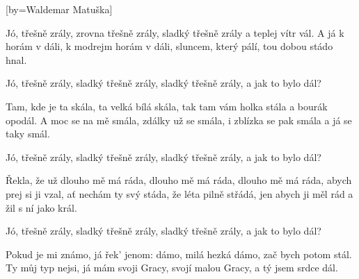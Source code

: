 [by={Waldemar Matuška}]

\beginverse{}
Jó, třešně zrály, zrovna třešně zrály,
sladký třešně zrály a teplej vítr vál. 
A já k horám v dáli, k modrejm horám v dáli,
sluncem, který pálí, tou dobou stádo hnal.
\endverse{}

\beginchorus{}
Jó, třešně zrály, sladký třešně zrály,
sladký třešně zrály, a jak to bylo dál?
\endchorus{}

\beginverse{}
Tam, kde je ta skála, ta velká bílá skála,
tak tam vám holka stála a bourák opodál.
A moc se na mě smála, zdálky už se smála,
i zblízka se pak smála a já se taky smál.
\endverse{}

\beginchorus{}
Jó, třešně zrály, sladký třešně zrály,
sladký třešně zrály, a jak to bylo dál?
\endchorus{}

\beginverse{}
Řekla, že už dlouho mě má ráda, dlouho mě má ráda,
dlouho mě má ráda, abych prej si ji vzal,
ať nechám ty svý stáda, že léta pilně střádá,
jen abych ji měl rád a žil s ní jako král.
\endverse{}

\beginchorus{}
Jó, třešně zrály, sladký třešně zrály,
sladký třešně zrály, a jak to bylo dál?
\endchorus{}

\beginverse{}
Pokud je mi známo, já řek' jenom: dámo,
milá hezká dámo, zač bych potom stál.
Ty můj typ nejsi, já mám svoji Gracy,
svojí malou Gracy, a tý jsem srdce dál.
\endverse{}

